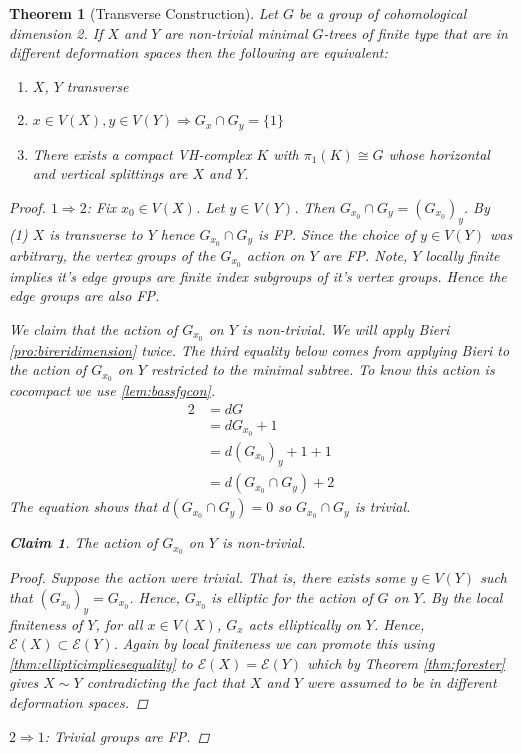 \documentclass[12pt,parskip=full]{report}
\theoremstyle{plain}
\newtheorem{thm}{Theorem}[section]
\theoremstyle{definition}
\newtheorem*{claim*}{Claim}
\begin{document}
\begin{thm}
    [Transverse Construction]
    \label{pro:transverseconstruction} 
 Let \(G\) be a group of cohomological dimension 2. If \(X\) and \(Y\) are non-trivial minimal \(G\)-trees of finite type that are in different deformation spaces then the following are equivalent:
\begin{enumerate}
    \item $X$, $Y$ transverse
    \item $x \in V(X), y\in V(Y)\Longrightarrow G_x\cap G_y = \{1\}$
    \item There exists a compact VH-complex $K$ with $\pi_1(K) \cong G$ whose horizontal and vertical splittings are $X$ and $Y$.
\end{enumerate}
\begin{proof}

    $1\Rightarrow 2$: Fix $x_0 \in V(X)$. Let $y\in V(Y)$. Then $G_{x_0} \cap G_y = (G_{x_0})_y$. By (1) $X$ is transverse to $Y$ hence $G_{x_0}\cap G_y$ is FP. Since the choice of $y\in V(Y)$ was arbitrary, the vertex groups of the $G_{x_0}$ action on $Y$ are FP. Note, $Y$ locally finite implies it's edge groups are finite index subgroups of it's vertex groups. Hence the edge groups are also FP. 
    
    We claim that the action of $G_{x_0}$ on $Y$ is non-trivial. We will apply Bieri \ref{pro:bireridimension} twice. The third equality below comes from applying Bieri to the action of \(G_{x_0}\) on \(Y\) restricted to the minimal subtree. To know this action is cocompact we use \ref{lem:bassfgcon}.
    \begin{align*}
        2 &= dG\\
          &= dG_{x_0}+1\\
          &= d( G_{x_0} )_y+1+1\\
          &= d(G_{x_0}\cap G_y)+2
    \end{align*}
    The equation shows that $d(G_{x_0}\cap G_y)=0$ so $G_{x_0}\cap G_y$ is trivial.
    
    \begin{claim*}
    The action of $G_{x_0}$ on $Y$ is non-trivial.
    \begin{proof}
        Suppose the action were trivial. That is, there exists some $y\in V(Y)$ such that $(G_{x_0})_y=G_{x_0}$. Hence, $G_{x_0}$ is elliptic for the action of $G$ on $Y$. By the local finiteness of $Y$, for all $x\in V(X)$, $G_x$ acts elliptically on $Y$. Hence, $\mathcal{E}(X)\subset \mathcal{E}(Y)$. Again by local finiteness we can promote this using \ref{thm:ellipticimpliesequality} to $\mathcal{E}(X) = \mathcal{E}(Y)$ which by Theorem \ref{thm:forester} gives $X \sim Y$  contradicting the fact that $X$ and $Y$ were assumed to be in different deformation spaces.
    \end{proof}
    \end{claim*}
$2\Rightarrow 1$: Trivial groups are FP.


\end{proof}
\end{thm}
\end{document}
